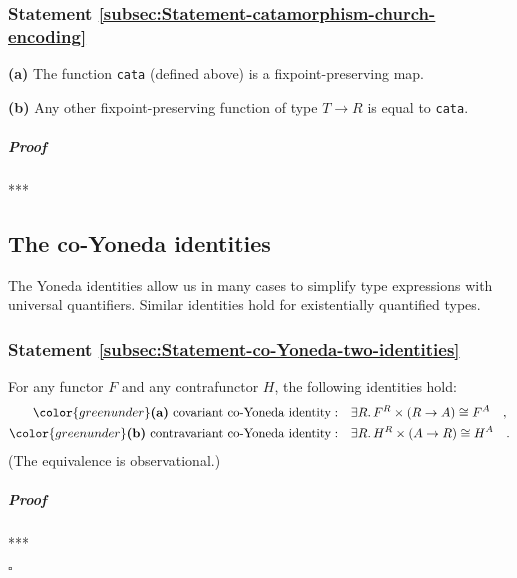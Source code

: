 \subsubsection{Statement \label{subsec:Statement-catamorphism-church-encoding}\ref{subsec:Statement-catamorphism-church-encoding}}

\textbf{(a)} The function \lstinline!cata!
(defined above) is a fixpoint-preserving map.

\textbf{(b)} Any other fixpoint-preserving function of type $T\rightarrow R$
is equal to \lstinline!cata!.

\subparagraph{Proof}

{*}{*}{*}

\subsection{The co-Yoneda identities}

The Yoneda identities allow us in many cases to simplify type expressions
with universal quantifiers. Similar identities hold for existentially
quantified types. 

\subsubsection{Statement \label{subsec:Statement-co-Yoneda-two-identities}\ref{subsec:Statement-co-Yoneda-two-identities}}

For any functor $F$ and any contrafunctor $H$, the following identities
hold:
\begin{align*}
{\color{greenunder}\text{\textbf{(a)} }\text{covariant co-Yoneda identity}:}\quad & \exists R.\,F^{R}\times\left(R\rightarrow A\right)\cong F^{A}\quad,\\
{\color{greenunder}\text{\textbf{(b)} }\text{contravariant co-Yoneda identity}:}\quad & \exists R.\,H^{R}\times\left(A\rightarrow R\right)\cong H^{A}\quad.
\end{align*}
(The equivalence is observational.)

\subparagraph{Proof}

{*}{*}{*}

$\square$

